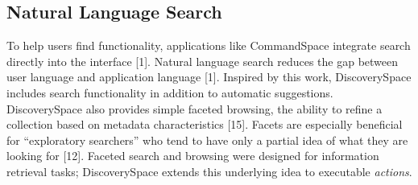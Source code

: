 \subsection{Natural Language Search}
To help users find functionality, applications like CommandSpace integrate search directly into the interface [1]. Natural language search reduces the gap between user language and application language [1]. Inspired by this work, Discovery\-Space includes search functionality in addition to automatic suggestions. Discovery\-Space also provides simple faceted browsing, the ability to refine a collection based on metadata characteristics [15]. Facets are especially beneficial for ``exploratory searchers'' who tend to have only a partial idea of what they are looking for [12]. Faceted search and browsing were designed for information retrieval tasks; Discovery\-Space extends this underlying idea to executable \textit{actions}.
